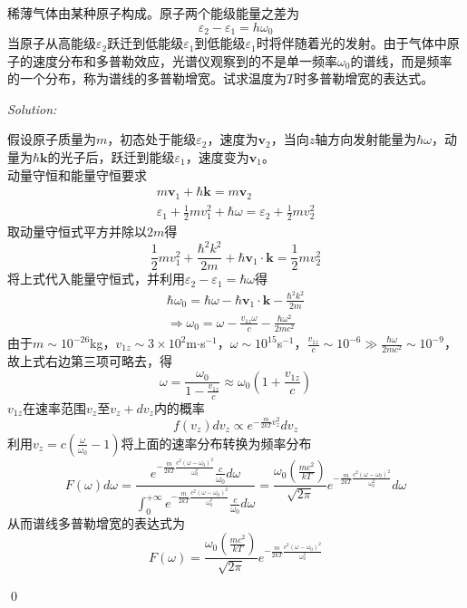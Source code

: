 \documentclass[12pt,a4paper]{article}
\newenvironment{problem}[2][Problem]{\begin{trivlist}
\item[\hskip \labelsep {\bfseries #1}\hskip \labelsep {\bfseries #2.}]}{\end{trivlist}}
\newenvironment{sol}
    {\emph{Solution:}
    }
    {
    \qed
    }
\begin{document}
\begin{problem}{7.8}
稀薄气体由某种原子构成。原子两个能级能量之差为
\[
\varepsilon_2-\varepsilon_1=h\omega_0
\]
当原子从高能级$\varepsilon_2$跃迁到低能级$\varepsilon_1$到低能级$\varepsilon_1$时将伴随着光的发射。由于气体中原子的速度分布和多普勒效应，光谱仪观察到的不是单一频率$\omega_0$的谱线，而是频率的一个分布，称为谱线的多普勒增宽。试求温度为$T$时多普勒增宽的表达式。
\end{problem}
\begin{sol}
假设原子质量为$m$，初态处于能级$\varepsilon_2$，速度为$\bm{v}_2$，当向$z$轴方向发射能量为$\hbar\omega$，动量为$\hbar\bm{k}$的光子后，跃迁到能级$\varepsilon_1$，速度变为$\bm{v}_1$。\\
动量守恒和能量守恒要求
\begin{gather}
m\bm{v}_1+\hbar\bm{k}=m\bm{v}_2\\
\varepsilon_1+\frac{1}{2}mv_1^2+\hbar\omega=\varepsilon_2+\frac{1}{2}mv_2^2
\end{gather}
取动量守恒式平方并除以$2m$得
\begin{equation}
\frac{1}{2}mv_1^2+\frac{\hbar^2k^2}{2m}+\hbar\bm{v}_1\cdot\bm{k}=\frac{1}{2}mv_2^2
\end{equation}
将上式代入能量守恒式，并利用$\varepsilon_2-\varepsilon_1=\hbar\omega$得
\begin{gather}
\hbar\omega_0=\hbar\omega-\hbar\bm{v}_1\cdot\bm{k}-\frac{\hbar^2k^2}{2m}\\
\Longrightarrow\omega_0=\omega-\frac{v_{1z}\omega}{c}-\frac{\hbar\omega^2}{2mc^2}
\end{gather}
由于$m\sim10^{-26}$kg，$v_{1z}\sim3\times10^2$m$\cdot$s$^{-1}$，$\omega\sim10^{15}$s$^{-1}$，$\frac{v_{1z}}{c}\sim10^{-6}\gg\frac{\hbar\omega}{2mc^2}\sim10^{-9}$，故上式右边第三项可略去，得
\begin{equation}
\omega=\frac{\omega_0}{1-\frac{v_{1z}}{c}}\approx\omega_0\left(1+\frac{v_{1z}}{c}\right)
\end{equation}
$v_{1z}$在速率范围$v_z$至$v_z+dv_z$内的概率
\begin{equation}
f(v_z)dv_z\propto e^{-\frac{m}{2kT}v_z^2}dv_z
\end{equation}
利用$v_z=c\left(\frac{\omega}{\omega_0}-1\right)$将上面的速率分布转换为频率分布
\begin{equation}
F(\omega)d\omega=\frac{e^{-\frac{m}{2kT}\frac{c^2(\omega-\omega_0)^2}{\omega_0^2}}\frac{c}{\omega_0}d\omega}{\int_0^{+\infty}e^{-\frac{m}{2kT}\frac{c^2(\omega-\omega_0)^2}{\omega_0^2}}\frac{c}{\omega_0}d\omega}=\frac{\omega_0\left(\frac{mc^2}{kT}\right)}{\sqrt{2\pi}}e^{-\frac{m}{2kT}\frac{c^2(\omega-\omega_0)^2}{\omega_0^2}}d\omega
\end{equation}
从而谱线多普勒增宽的表达式为
\begin{equation}
F(\omega)=\frac{\omega_0\left(\frac{mc^2}{kT}\right)}{\sqrt{2\pi}}e^{-\frac{m}{2kT}\frac{c^2(\omega-\omega_0)^2}{\omega_0^2}}
\end{equation}
\end{sol}
\end{document}
